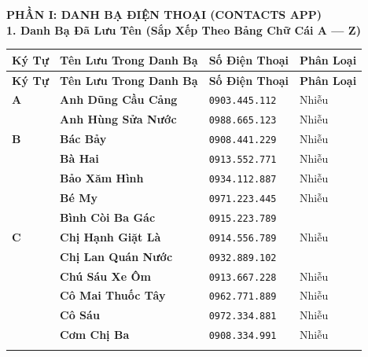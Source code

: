 \documentclass[12pt,a4paper]{article}
\begin{document}
\vspace{0.35cm}\noindent\textbf{\large  PHẦN I: DANH BẠ ĐIỆN THOẠI (CONTACTS APP)}\\[0.15cm]



\vspace{0.3cm}\noindent\textbf{\large 1. Danh Bạ Đã Lưu Tên (Sắp Xếp Theo Bảng Chữ Cái A — Z)}\\[0.15cm]



\vspace{0.2cm}
\begingroup
\begin{xltabular}{\textwidth}{>{\hsize}X >{\hsize}X >{\hsize}X >{\hsize}X}
\toprule
\textbf{Ký Tự} & \textbf{Tên Lưu Trong Danh Bạ} & \textbf{Số Điện Thoại} & \textbf{Phân Loại} \\
\midrule
\endfirsthead
\toprule
\textbf{Ký Tự} & \textbf{Tên Lưu Trong Danh Bạ} & \textbf{Số Điện Thoại} & \textbf{Phân Loại} \\
\midrule
\endhead
\bottomrule
\endfoot
\textbf{A} & \textbf{Anh Dũng Cầu Cảng} & \texttt{0903.445.112} & Nhiễu \\ \addlinespace[4pt]
 & \textbf{Anh Hùng Sửa Nước} & \texttt{0988.665.123} & Nhiễu \\ \addlinespace[4pt]
\textbf{B} & \textbf{Bác Bảy} & \texttt{0908.441.229} & Nhiễu \\ \addlinespace[4pt]
 & \textbf{Bà Hai} & \texttt{0913.552.771} & Nhiễu \\ \addlinespace[4pt]
 & \textbf{Bảo Xăm Hình} & \texttt{0934.112.887} & Nhiễu \\ \addlinespace[4pt]
 & \textbf{Bé My} & \texttt{0971.223.445} & Nhiễu \\ \addlinespace[4pt]
 & \textbf{Bình Còi Ba Gác} & \texttt{0915.223.789} &  \\ \addlinespace[4pt]
\textbf{C} & \textbf{Chị Hạnh Giặt Là} & \texttt{0914.556.789} & Nhiễu \\ \addlinespace[4pt]
 & \textbf{Chị Lan Quán Nước} & \texttt{0932.889.102} &  \\ \addlinespace[4pt]
 & \textbf{Chú Sáu Xe Ôm} & \texttt{0913.667.228} & Nhiễu \\ \addlinespace[4pt]
 & \textbf{Cô Mai Thuốc Tây} & \texttt{0962.771.889} & Nhiễu \\ \addlinespace[4pt]
 & \textbf{Cô Sáu} & \texttt{0972.334.881} & Nhiễu \\ \addlinespace[4pt]
 & \textbf{Cơm Chị Ba} & \texttt{0908.334.991} & Nhiễu \\ \addlinespace[4pt]

\end{xltabular}
\end{document}
